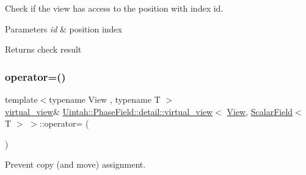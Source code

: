 Check if the view has access to the position with index id. 


\begin{DoxyParams}{Parameters}
{\em id} & position index \\
\hline
\end{DoxyParams}
\begin{DoxyReturn}{Returns}
check result 
\end{DoxyReturn}
\mbox{\label{classUintah_1_1PhaseField_1_1detail_1_1virtual__view_3_01View_00_01ScalarField_3_01T_01_4_01_4_ac276fba9d0f6c717514d2087367c8ef1}} 
\subsubsection{\texorpdfstring{operator=()}{operator=()}}
{\footnotesize\ttfamily template$<$typename View , typename T $>$ \\
\hyperlink{classUintah_1_1PhaseField_1_1detail_1_1virtual__view}{virtual\+\_\+view}\& \hyperlink{classUintah_1_1PhaseField_1_1detail_1_1virtual__view}{Uintah\+::\+Phase\+Field\+::detail\+::virtual\+\_\+view}$<$ \hyperlink{namespaceUintah_1_1PhaseField_a59210a1e28eba254d428762c92ddeabb}{View}, \hyperlink{structUintah_1_1PhaseField_1_1ScalarField}{Scalar\+Field}$<$ T $>$ $>$\+::operator= (\begin{DoxyParamCaption}\item[{const \hyperlink{classUintah_1_1PhaseField_1_1detail_1_1virtual__view}{virtual\+\_\+view}$<$ \hyperlink{namespaceUintah_1_1PhaseField_a59210a1e28eba254d428762c92ddeabb}{View}, \hyperlink{structUintah_1_1PhaseField_1_1ScalarField}{Scalar\+Field}$<$ T $>$ $>$ \&}]{ }\end{DoxyParamCaption})\hspace{0.3cm}{\ttfamily [delete]}}



Prevent copy (and move) assignment. 

\mbox{\label{classUintah_1_1PhaseField_1_1detail_1_1virtual__view_3_01View_00_01ScalarField_3_01T_01_4_01_4_a443527d662efea83fb709b0df277f0f2}} 
